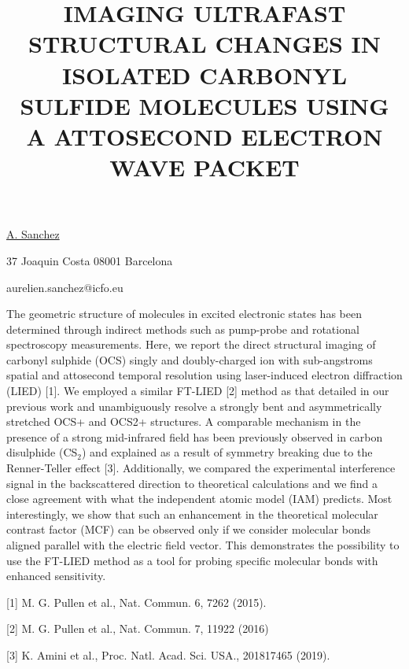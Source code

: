 \title{IMAGING ULTRAFAST STRUCTURAL CHANGES IN ISOLATED CARBONYL SULFIDE MOLECULES USING A ATTOSECOND ELECTRON WAVE PACKET}

\underline{A. Sanchez}  

{\normalsize{\vspace{-4mm}
37 Joaquin Costa 08001 Barcelona



\email aurelien.sanchez@icfo.eu}}

The geometric structure of molecules in excited electronic states has been determined through indirect methods such as pump-probe and rotational spectroscopy measurements. Here, we report the direct structural imaging of carbonyl sulphide (OCS) singly and doubly-charged ion with sub-angstroms spatial and attosecond temporal resolution using laser-induced electron diffraction (LIED) [1]. We employed a similar FT-LIED [2] method as that detailed in our previous work and unambiguously resolve a strongly bent and asymmetrically stretched OCS+ and OCS2+ structures. A comparable mechanism in the presence of a strong mid-infrared field has been previously observed in carbon disulphide (CS$_2$) and explained as a result of symmetry breaking due to the Renner-Teller effect [3]. Additionally, we compared the experimental interference signal in the backscattered direction to theoretical calculations and we find a close agreement with what the independent atomic model (IAM) predicts. Most interestingly, we show that such an enhancement in the theoretical molecular contrast factor (MCF) can be observed only if we consider molecular bonds aligned parallel with the electric field vector. This demonstrates the possibility to use the FT-LIED method as a tool for probing specific molecular bonds with enhanced sensitivity.

{\normalsize
[1] M. G. Pullen et al., Nat. Commun. 6, 7262 (2015).
\vsp

[2] M. G. Pullen et al., Nat. Commun. 7, 11922 (2016)
\vsp

[3] K. Amini et al., Proc. Natl. Acad. Sci. USA., 201817465 (2019).
}

\vspace{\baselineskip}